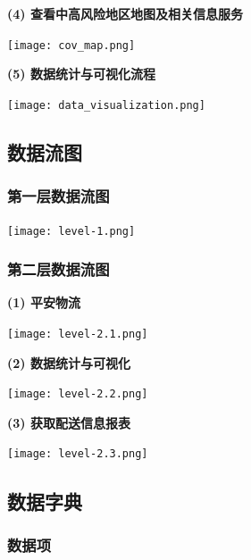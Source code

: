 \documentclass[12pt]{article}
\begin{document}
\noindent \textbf{(4) 查看中高风险地区地图及相关信息服务}
\begin{center}
	\texttt{[image: cov\_map.png]}
\end{center}

\noindent \textbf{(5) 数据统计与可视化流程}
\begin{center}
	\texttt{[image: data\_visualization.png]}
\end{center}

\newpage
\subsection{数据流图}

\subsubsection{第一层数据流图}

\begin{center}
	\texttt{[image: level-1.png]}
\end{center}

\subsubsection{第二层数据流图}

\noindent \textbf{(1) 平安物流}
\begin{center}
	\texttt{[image: level-2.1.png]}
\end{center}

\noindent \textbf{(2) 数据统计与可视化}
\begin{center}
	\texttt{[image: level-2.2.png]}
\end{center}

\noindent \textbf{(3) 获取配送信息报表}
\begin{center}
	\texttt{[image: level-2.3.png]}
\end{center}

\newpage
\subsection{数据字典}

\subsubsection{数据项}

\tabletail{\bottomrule}
\end{document}
